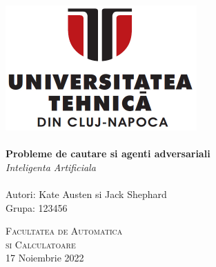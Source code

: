 \begin{titlepage}
\begin{center}

\includegraphics[width=0.55\textwidth]{resources/utcn_logo.jpg}~\\[2cm]

\HRule \\[0.4cm]
{ \LARGE
    \textbf{Probleme de cautare si agenti adversariali}\\[0.4cm]
    \emph{Inteligenta Artificiala}\\[0.4cm]
}
\HRule \\[1.5cm]

{ \large
    Autori: Kate Austen si Jack Shephard \\[0.1cm]
    Grupa: 123456\\[0.1cm]
}

\vfill
\textsc{\large Facultatea de Automatica\\si Calculatoare}\\[0.4cm]

{\large 17 Noiembrie 2022}
    
\end{center}
\end{titlepage}